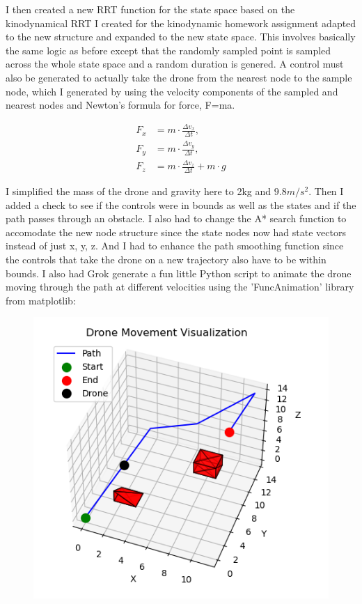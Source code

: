 \documentclass{article}
\begin{document}
I then created a new RRT function for the state space based on the kinodynamical RRT I created for the kinodynamic homework assignment adapted to the new structure and expanded to the new state space.
This involves basically the same logic as before except that the randomly sampled point is sampled across the whole state space and a random duration is genered.
A control must also be generated to actually take the drone from the nearest node to the sample node, which I generated by using the velocity components of the sampled and nearest nodes and Newton's formula for force, F=ma.

\begin{align*}
    F_x &= m \cdot \frac{\Delta v_x}{\Delta t}, \\
    F_y &= m \cdot \frac{\Delta v_y}{\Delta t}, \\
    F_z &= m \cdot \frac{\Delta v_z}{\Delta t} + m \cdot g
\end{align*}

I simplified the mass of the drone and gravity here to 2kg and $9.8m/s^2$.
Then I added a check to see if the controls were in bounds as well as the states and if the path passes through an obstacle.
I also had to change the A* search function to accomodate the new node structure since the state nodes now had state vectors instead of just x, y, z.
And I had to enhance the path smoothing function since the controls that take the drone on a new trajectory also have to be within bounds.
I also had Grok generate a fun little Python script to animate the drone moving through the path at different velocities using the 'FuncAnimation' library from matplotlib:

\begin{figure}[H]
    \centering
    \includegraphics[width=0.7\linewidth]{kinoAnimation.png}
\end{figure}
\end{document}
